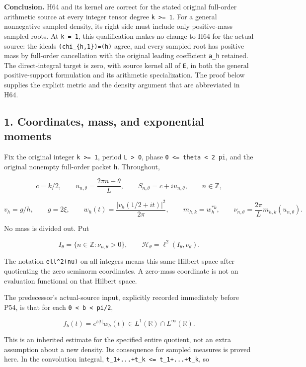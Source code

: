 \textbf{Conclusion.} H64 and its kernel are correct for the stated original full-order arithmetic source at every integer tensor degree \texttt{k\ \textgreater{}=\ 1}. For a general nonnegative sampled density, its right side must include only positive-mass sampled roots. At \texttt{k\ =\ 1}, this qualification makes no change to H64 for the actual source: the ideals \texttt{(chi\_\{h,1\})=(h)} agree, and every sampled root has positive mass by full-order cancellation with the original leading coefficient \texttt{a\_h} retained. The direct-integral target is zero, with source kernel all of \texttt{E}, in both the general positive-support formulation and its arithmetic specialization. The proof below supplies the explicit metric and the density argument that are abbreviated in H64.

\subsection{1. Coordinates, mass, and exponential moments}\label{coordinates-mass-and-exponential-moments}

Fix the original integer \texttt{k\ \textgreater{}=\ 1}, period \texttt{L\ \textgreater{}\ 0}, phase \texttt{0\ \textless{}=\ theta\ \textless{}\ 2\ pi}, and the original nonempty full-order packet \texttt{h}. Throughout,

\[
c=k/2,\qquad
u_{n,\theta}=\frac{2\pi n+\theta}{L},\qquad
S_{n,\theta}=c+i u_{n,\theta},\qquad n\in\mathbb Z,
\tag{CQ1}
\]

\[
v_h=g/h,\qquad g=2\xi,\qquad
w_h(t)=\frac{|v_h(1/2+it)|^2}{2\pi},\qquad
m_{h,k}=w_h^{*k},\qquad
\nu_{n,\theta}=\frac{2\pi}{L}m_{h,k}(u_{n,\theta}).
\tag{CQ2}
\]

No mass is divided out. Put

\[
I_\theta=\{n\in\mathbb Z:\nu_{n,\theta}>0\},\qquad
\mathcal H_\theta=\ell^2(I_\theta,\nu_\theta).
\tag{CQ3}
\]

The notation \texttt{ell\^{}2(nu)} on all integers means this same Hilbert space after quotienting the zero seminorm coordinates. A zero-mass coordinate is not an evaluation functional on that Hilbert space.

The predecessor's actual-source input, explicitly recorded immediately before P54, is that for each \texttt{0\ \textless{}\ b\ \textless{}\ pi/2},

\[
f_b(t)=e^{b|t|}w_h(t)\in L^1(\mathbb R)\cap L^\infty(\mathbb R).
\tag{CQ4}
\]

This is an inherited estimate for the specified entire quotient, not an extra assumption about a new density. Its consequence for sampled measures is proved here. In the convolution integral, \texttt{\textbar{}t\_1+...+t\_k\textbar{}\ \textless{}=\ \textbar{}t\_1\textbar{}+...+\textbar{}t\_k\textbar{}}, so

